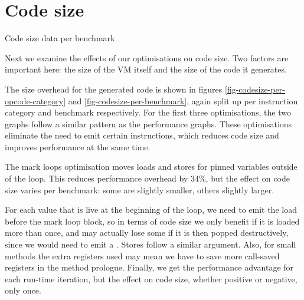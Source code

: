 \section{Code size}
\begin{table}[]
 \centering
 \caption{Code size data per benchmark}
 \label{tbl-codesize-per-benchmark}
 \small
 \scriptsize
 \setlength{\tabcolsep}{4pt}
 
 \setlength{\tabcolsep}{6pt}
\end{table}


Next we examine the effects of our optimisations on code size. Two factors are important here: the size of the VM itself and the size of the code it generates.

The size overhead for the generated code is shown in figures \ref{fig-codesize-per-opcode-category} and \ref{fig-codesize-per-benchmark}, again split up per instruction category and benchmark respectively. For the first three optimisations, the two graphs follow a similar pattern as the performance graphs. These optimisations eliminate the need to emit certain instructions, which reduces code size and improves performance at the same time.

The mark loops optimisation moves loads and stores for pinned variables outside of the loop. This reduces performance overhead by 34\%, but the effect on code size varies per benchmark: some are slightly smaller, others slightly larger.

For each value that is live at the beginning of the loop, we need to emit the load before the mark loop block, so in terms of code size we only benefit if it is loaded more than once, and may actually lose some if it is then popped destructively, since we would need to emit a . Stores follow a similar argument. Also, for small methods the extra registers used may mean we have to save more call-saved registers in the method prologue. Finally, we get the performance advantage for each run-time iteration, but the effect on code size, whether positive or negative, only once.

